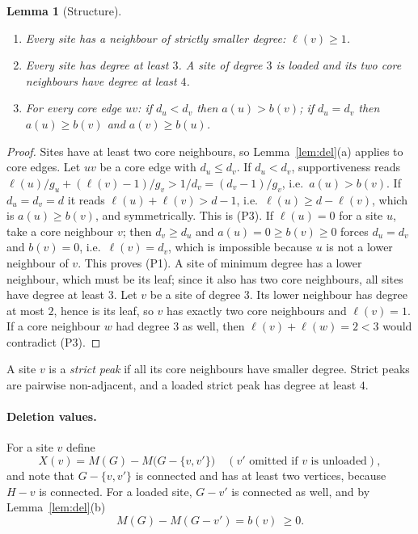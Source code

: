 \documentclass[11pt,a4paper]{article}
\newtheorem{lemma}[theorem]{Lemma}
\theoremstyle{definition}
\theoremstyle{remark}
\numberwithin{equation}{section}
\begin{document}
\begin{lemma}[Structure]\label{lem:struct}
\begin{enumerate}[label=\textup{(P\arabic*)}]
\item Every site has a neighbour of strictly smaller degree: $\ell(v)\ge1$.
\item Every site has degree at least $3$. A site of degree $3$ is loaded and its
two core neighbours have degree at least $4$.
\item For every core edge $uv$: if $d_u<d_v$ then $a(u)>b(v)$; if $d_u=d_v$ then
$a(u)\ge b(v)$ and $a(v)\ge b(u)$.
\end{enumerate}
\end{lemma}
\begin{proof}
Sites have at least two core neighbours, so Lemma~\ref{lem:del}(a) applies to core
edges. Let $uv$ be a core edge with $d_u\le d_v$. If $d_u<d_v$, supportiveness reads
$\ell(u)/g_u+(\ell(v)-1)/g_v>1/d_v=(d_v-1)/g_v$, i.e.\ $a(u)>b(v)$. If $d_u=d_v=d$
it reads $\ell(u)+\ell(v)>d-1$, i.e.\ $\ell(u)\ge d-\ell(v)$, which is $a(u)\ge b(v)$,
and symmetrically. This is (P3). If $\ell(u)=0$ for a site $u$, take a core
neighbour $v$; then $d_v\ge d_u$ and $a(u)=0\ge b(v)\ge0$ forces $d_u=d_v$ and
$b(v)=0$, i.e.\ $\ell(v)=d_v$, which is impossible because $u$ is not a lower
neighbour of $v$. This proves (P1). A site of minimum degree has a lower neighbour,
which must be its leaf; since it also has two core neighbours, all sites have degree
at least $3$. Let $v$ be a site of degree $3$. Its lower neighbour has degree at most
$2$, hence is its leaf, so $v$ has exactly two core neighbours and $\ell(v)=1$. If a
core neighbour $w$ had degree $3$ as well, then $\ell(v)+\ell(w)=2<3$ would
contradict (P3).
\end{proof}

A site $v$ is a \emph{strict peak} if all its core neighbours have smaller degree.
Strict peaks are pairwise non-adjacent, and a loaded strict peak has degree at
least $4$.

\paragraph{Deletion values.}
For a site $v$ define
\[
 X(v)=M(G)-M\bigl(G-\{v,v'\}\bigr)\quad(\text{$v'$ omitted if $v$ is unloaded}),
\]
and note that $G-\{v,v'\}$ is connected and has at least two vertices, because
$H-v$ is connected. For a loaded site, $G-v'$ is connected as well, and by
Lemma~\ref{lem:del}(b)
\begin{equation}\label{eq:bleaf}
 M(G)-M(G-v')=b(v)\ \ge0 .
\end{equation}
\end{document}
